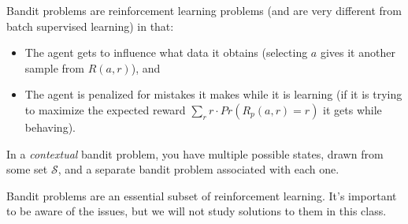 Bandit problems are reinforcement learning problems (and are very
different from batch supervised learning)  in that:
\begin{itemize}
  \item The agent gets to influence what data it obtains (selecting $a$
        gives it another sample from $R(a, r)$), and
  \item The agent is penalized for mistakes it makes while it is
        learning (if it is trying to maximize the expected
        reward $\sum_r r \cdot Pr(R_p(a, r) = r)$ it gets while behaving).
\end{itemize}

In a {\em contextual} bandit problem, you have multiple possible states, drawn from some
set $\mathcal{S}$, and a separate bandit problem associated with each
one.

Bandit problems are an essential subset of reinforcement
learning.  It's important to be aware of the issues, but we will not
study solutions to them in this class.



